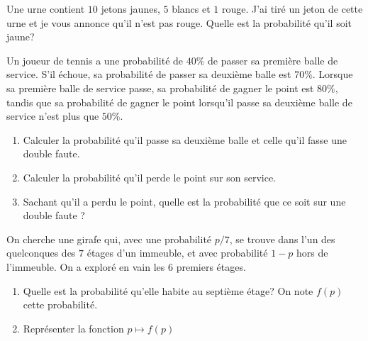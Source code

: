 \documentclass[a4paper,11pt,reqno]{amsart}
\begin{document}


\begin{exo}

  Une urne contient $10$ jetons jaunes, $5$ blancs et $1$ rouge. J'ai tiré un jeton de cette urne et je vous annonce qu'il n'est pas rouge. Quelle est la probabilité qu'il soit jaune?

\end{exo}

\begin{exo}

  Un joueur de tennis a une probabilité de $40\%$ de passer sa première balle de service. S'il échoue, sa probabilité de passer sa deuxième balle est $70\%$. Lorsque sa première balle de service passe, sa probabilité de gagner le point est $80\%$, tandis que sa probabilité de gagner le point lorsqu'il passe sa deuxième balle de service n'est plus que $50\%$.

  \begin{enumerate}
    \item Calculer la probabilité qu'il passe sa deuxième balle et celle qu'il fasse une double faute.
    \item Calculer la probabilité qu'il perde le point sur son service.
    \item Sachant qu'il a perdu le point, quelle est la probabilité que ce soit sur une double faute ?
  \end{enumerate}

\end{exo}

\begin{exo}

  On cherche une girafe qui, avec une probabilité $p/7$, se trouve dans l'un des quelconques des $7$ étages d'un immeuble, et avec probabilité $1-p$ hors de l'immeuble. On a exploré en vain les $6$ premiers étages.

  \begin{enumerate}
    \item Quelle est la probabilité qu'elle habite au  septième étage? On note $f(p)$ cette probabilité.
    \item Représenter  la fonction $p\mapsto f(p)$
  \end{enumerate}

\end{exo}
\end{document}
